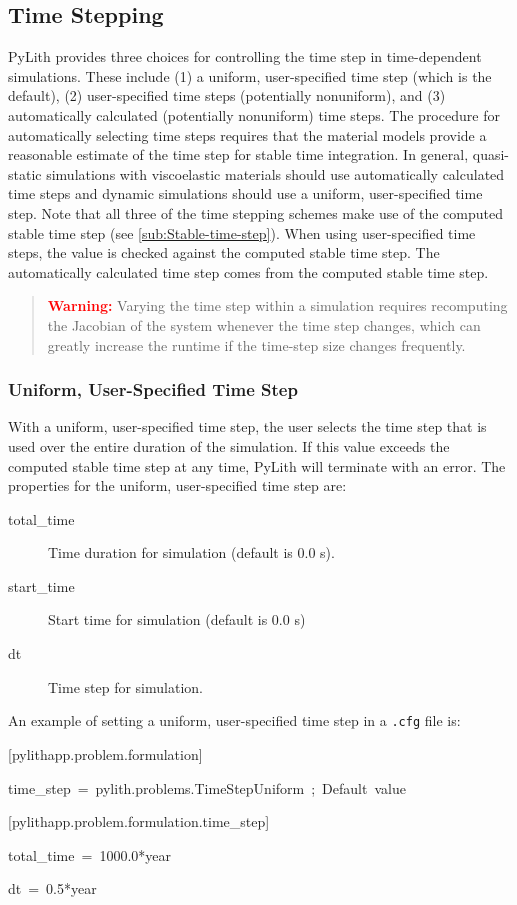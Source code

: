 \subsection{\label{sub:Time-Stepping}Time Stepping}

PyLith provides three choices for controlling the time step in time-dependent
simulations. These include (1) a uniform, user-specified time step
(which is the default), (2) user-specified time steps (potentially
nonuniform), and (3) automatically calculated (potentially nonuniform)
time steps. The procedure for automatically selecting time steps requires
that the material models provide a reasonable estimate of the time
step for stable time integration. In general, quasi-static simulations
with viscoelastic materials should use automatically calculated time
steps and dynamic simulations should use a uniform, user-specified
time step. Note that all three of the time stepping schemes make use
of the computed stable time step (see \ref{sub:Stable-time-step}).
When using user-specified time steps, the value is checked against
the computed stable time step. The automatically calculated time step
comes from the computed stable time step.
\begin{quote}
\textbf{\textcolor{red}{Warning:}} Varying the time step within a
simulation requires recomputing the Jacobian of the system whenever
the time step changes, which can greatly increase the runtime if the
time-step size changes frequently.
\end{quote}

\subsubsection{Uniform, User-Specified Time Step}

With a uniform, user-specified time step, the user selects the time
step that is used over the entire duration of the simulation. If this
value exceeds the computed stable time step at any time, PyLith will
terminate with an error. The properties for the uniform, user-specified
time step are:
\begin{description}
\item [{total\_time}] Time duration for simulation (default is 0.0 s).
\item [{start\_time}] Start time for simulation (default is 0.0 s)
\item [{dt}] Time step for simulation.
\end{description}
An example of setting a uniform, user-specified time step in a \texttt{.cfg}
file is:
\begin{lyxcode}
{[}pylithapp.problem.formulation{]}

time\_step~=~pylith.problems.TimeStepUniform~;~Default~value



{[}pylithapp.problem.formulation.time\_step{]}

total\_time~=~1000.0{*}year

dt~=~0.5{*}year
\end{lyxcode}

